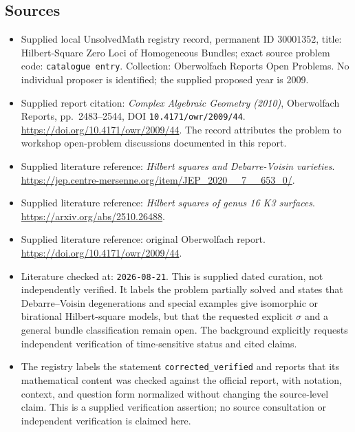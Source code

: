 \documentclass[11pt]{article}
\begin{document}
\subsection{Sources}
\begin{itemize}
\item Supplied local UnsolvedMath registry record, permanent ID \(30001352\), title: Hilbert-Square Zero Loci of Homogeneous Bundles; exact source problem code: \texttt{catalogue entry}. Collection: Oberwolfach Reports Open Problems. No individual proposer is identified; the supplied proposed year is 2009.
\item Supplied report citation: \emph{Complex Algebraic Geometry (2010)}, Oberwolfach Reports, pp.\ 2483--2544, DOI \texttt{10.4171/owr/2009/44}. \url{https://doi.org/10.4171/owr/2009/44}. The record attributes the problem to workshop open-problem discussions documented in this report.
\item Supplied literature reference: \emph{Hilbert squares and Debarre-Voisin varieties}. \url{https://jep.centre-mersenne.org/item/JEP_2020__7__653_0/}.
\item Supplied literature reference: \emph{Hilbert squares of genus 16 K3 surfaces}. \url{https://arxiv.org/abs/2510.26488}.
\item Supplied literature reference: original Oberwolfach report. \url{https://doi.org/10.4171/owr/2009/44}.
\item Literature checked at: \texttt{2026-08-21}. This is supplied dated curation, not independently verified. It labels the problem partially solved and states that Debarre--Voisin degenerations and special examples give isomorphic or birational Hilbert-square models, but that the requested explicit \(\sigma\) and a general bundle classification remain open. The background explicitly requests independent verification of time-sensitive status and cited claims.
\item The registry labels the statement \texttt{corrected\_verified} and reports that its mathematical content was checked against the official report, with notation, context, and question form normalized without changing the source-level claim. This is a supplied verification assertion; no source consultation or independent verification is claimed here.
\end{itemize}
\end{document}
